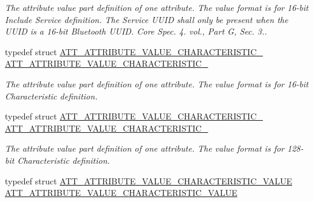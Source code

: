 \begin{DoxyCompactItemize}
\begin{DoxyCompactList}\small\item\em The attribute value part definition of one attribute. The value format is for 16-\/bit Include Service definition. The Service U\+U\+ID shall only be present when the U\+U\+ID is a 16-\/bit Bluetooth U\+U\+ID. Core Spec. 4. vol., Part G, Sec. 3.. \end{DoxyCompactList}\item 
typedef struct \hyperlink{struct_a_t_t___a_t_t_r_i_b_u_t_e___v_a_l_u_e___c_h_a_r_a_c_t_e_r_i_s_t_i_c__2}{A\+T\+T\+\_\+\+A\+T\+T\+R\+I\+B\+U\+T\+E\+\_\+\+V\+A\+L\+U\+E\+\_\+\+C\+H\+A\+R\+A\+C\+T\+E\+R\+I\+S\+T\+I\+C\+\_} \hyperlink{group___b_l_e___g_a_t_t___s_e_r_v_i_c_e___t_a_b_l_e_ga29e889a62ee64c87b7e5ecd31481d23c}{A\+T\+T\+\_\+\+A\+T\+T\+R\+I\+B\+U\+T\+E\+\_\+\+V\+A\+L\+U\+E\+\_\+\+C\+H\+A\+R\+A\+C\+T\+E\+R\+I\+S\+T\+I\+C\+\_}\hypertarget{group___b_l_e___g_a_t_t___s_e_r_v_i_c_e___t_a_b_l_e_ga29e889a62ee64c87b7e5ecd31481d23c}{}\label{group___b_l_e___g_a_t_t___s_e_r_v_i_c_e___t_a_b_l_e_ga29e889a62ee64c87b7e5ecd31481d23c}

\begin{DoxyCompactList}\small\item\em The attribute value part definition of one attribute. The value format is for 16-\/bit Characteristic definition. \end{DoxyCompactList}\item 
typedef struct \hyperlink{struct_a_t_t___a_t_t_r_i_b_u_t_e___v_a_l_u_e___c_h_a_r_a_c_t_e_r_i_s_t_i_c__16}{A\+T\+T\+\_\+\+A\+T\+T\+R\+I\+B\+U\+T\+E\+\_\+\+V\+A\+L\+U\+E\+\_\+\+C\+H\+A\+R\+A\+C\+T\+E\+R\+I\+S\+T\+I\+C\+\_} \hyperlink{group___b_l_e___g_a_t_t___s_e_r_v_i_c_e___t_a_b_l_e_gaa0bc5e68b22df2ef9e149c9a2b991ba6}{A\+T\+T\+\_\+\+A\+T\+T\+R\+I\+B\+U\+T\+E\+\_\+\+V\+A\+L\+U\+E\+\_\+\+C\+H\+A\+R\+A\+C\+T\+E\+R\+I\+S\+T\+I\+C\+\_}\hypertarget{group___b_l_e___g_a_t_t___s_e_r_v_i_c_e___t_a_b_l_e_gaa0bc5e68b22df2ef9e149c9a2b991ba6}{}\label{group___b_l_e___g_a_t_t___s_e_r_v_i_c_e___t_a_b_l_e_gaa0bc5e68b22df2ef9e149c9a2b991ba6}

\begin{DoxyCompactList}\small\item\em The attribute value part definition of one attribute. The value format is for 128-\/bit Characteristic definition. \end{DoxyCompactList}\item 
typedef struct \hyperlink{struct_a_t_t___a_t_t_r_i_b_u_t_e___v_a_l_u_e___c_h_a_r_a_c_t_e_r_i_s_t_i_c___v_a_l_u_e}{A\+T\+T\+\_\+\+A\+T\+T\+R\+I\+B\+U\+T\+E\+\_\+\+V\+A\+L\+U\+E\+\_\+\+C\+H\+A\+R\+A\+C\+T\+E\+R\+I\+S\+T\+I\+C\+\_\+\+V\+A\+L\+UE} \hyperlink{group___b_l_e___g_a_t_t___s_e_r_v_i_c_e___t_a_b_l_e_ga31f3c4bce065228bf9469fd3c53b3b3e}{A\+T\+T\+\_\+\+A\+T\+T\+R\+I\+B\+U\+T\+E\+\_\+\+V\+A\+L\+U\+E\+\_\+\+C\+H\+A\+R\+A\+C\+T\+E\+R\+I\+S\+T\+I\+C\+\_\+\+V\+A\+L\+UE}\hypertarget{group___b_l_e___g_a_t_t___s_e_r_v_i_c_e___t_a_b_l_e_ga31f3c4bce065228bf9469fd3c53b3b3e}{}\label{group___b_l_e___g_a_t_t___s_e_r_v_i_c_e___t_a_b_l_e_ga31f3c4bce065228bf9469fd3c53b3b3e}


\end{DoxyCompactItemize}
